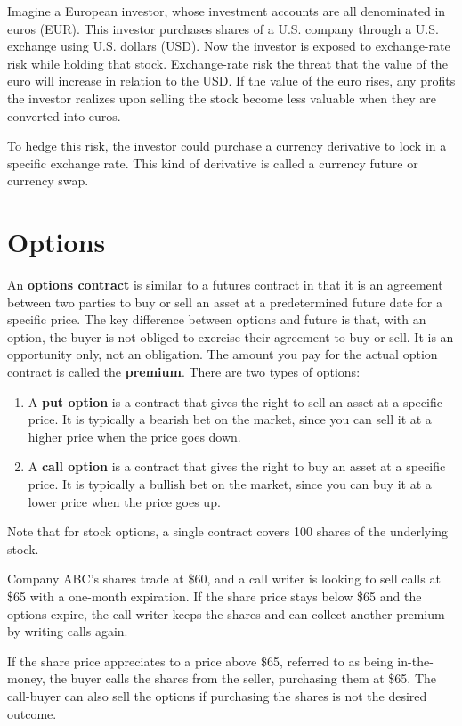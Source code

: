 \documentclass{article}
\begin{document}
  \begin{example}
    Imagine a European investor, whose investment accounts are all denominated in euros (EUR). This investor purchases shares of a U.S. company through a U.S. exchange using U.S. dollars (USD). Now the investor is exposed to exchange-rate risk while holding that stock. Exchange-rate risk the threat that the value of the euro will increase in relation to the USD. If the value of the euro rises, any profits the investor realizes upon selling the stock become less valuable when they are converted into euros.

    To hedge this risk, the investor could purchase a currency derivative to lock in a specific exchange rate. This kind of derivative is called a currency future or currency swap. 
  \end{example}

\section{Options}

  \begin{definition}[Options]
    An \textbf{options contract} is similar to a futures contract in that it is an agreement between two parties to buy or sell an asset at a predetermined future date for a specific price. The key difference between options and future is that, with an option, the buyer is not obliged to exercise their agreement to buy or sell. It is an opportunity only, not an obligation. The amount you pay for the actual option contract is called the \textbf{premium}. There are two types of options: 
    \begin{enumerate}
        \item A \textbf{put option} is a contract that gives the right to sell an asset at a specific price. It is typically a bearish bet on the market, since you can sell it at a higher price when the price goes down. 
        \item A \textbf{call option} is a contract that gives the right to buy an asset at a specific price. It is typically a bullish bet on the market, since you can buy it at a lower price when the price goes up. 
    \end{enumerate}
    Note that for stock options, a single contract covers 100 shares of the underlying stock. 
  \end{definition}

  \begin{example}
    Company ABC's shares trade at \$60, and a call writer is looking to sell calls at \$65 with a one-month expiration. If the share price stays below \$65 and the options expire, the call writer keeps the shares and can collect another premium by writing calls again. 

    If the share price appreciates to a price above \$65, referred to as being in-the-money, the buyer calls the shares from the seller, purchasing them at \$65. The call-buyer can also sell the options if purchasing the shares is not the desired outcome.
  \end{example}
\end{document}

